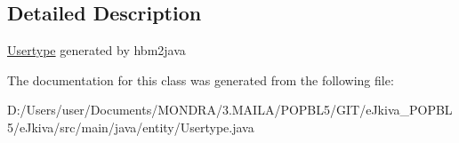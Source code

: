 \subsection{Detailed Description}
\mbox{\hyperlink{classentity_1_1_usertype}{Usertype}} generated by hbm2java 

The documentation for this class was generated from the following file\+:\begin{DoxyCompactItemize}
\item 
D\+:/\+Users/user/\+Documents/\+M\+O\+N\+D\+R\+A/3.\+M\+A\+I\+L\+A/\+P\+O\+P\+B\+L5/\+G\+I\+T/e\+Jkiva\+\_\+\+P\+O\+P\+B\+L5/e\+Jkiva/src/main/java/entity/Usertype.\+java\end{DoxyCompactItemize}
